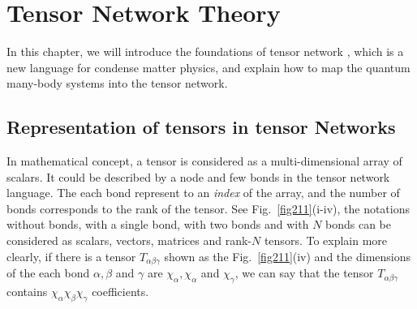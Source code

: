 \chapter{Tensor Network Theory} 
\label{chap2}
In this chapter, we will introduce the foundations of tensor network \cite{jordan_studies_2011,Orus2014117,bauer_tensor_2011}, which is a new language for condense matter physics, and explain how to map the quantum many-body systems into the tensor network. 

\section{Representation of tensors in tensor Networks}
\label{notations}

In mathematical concept, a tensor is considered as a multi-dimensional array of scalars. It could be described by a node and few bonds in the tensor network language. The each bond represent to an \textit{index} of the array, and the number of bonds corresponds to the rank of the tensor. See Fig.~\ref{fig211}(i-iv), the notations without bonds, with a single bond, with two bonds and with $N$ bonds can be considered as scalars, vectors, matrices and rank-$N$ tensors. To explain more clearly, if there is a tensor $T_{\alpha \beta \gamma}$ shown as the Fig.~\ref{fig211}(iv) and the dimensions of the each bond $\alpha, \beta$ and $\gamma$ are $\chi_{\alpha},\chi_{\alpha}$ and $\chi_{\gamma}$, we can say that the tensor $T_{\alpha \beta \gamma}$ contains $\chi_{\alpha}\chi_{\beta}\chi_{\gamma}$ coefficients.


